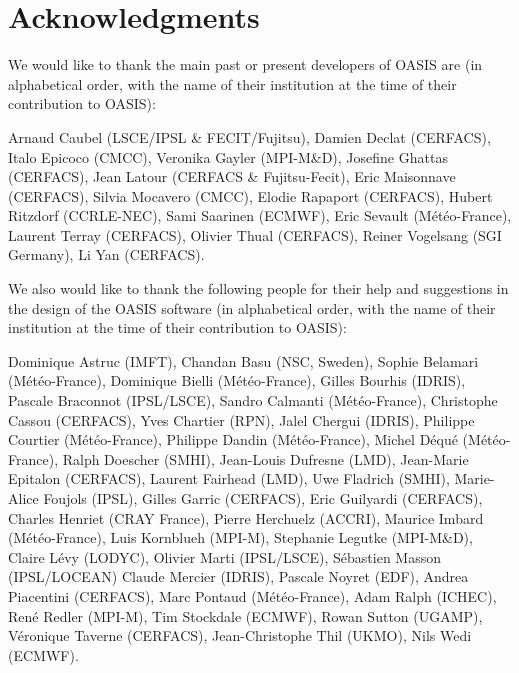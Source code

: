 \newpage


\section{Acknowledgments}

We would like to thank the main past or present developers of OASIS
are (in alphabetical order, with the name of their institution at the time of their contribution to OASIS):

Arnaud Caubel (LSCE/IPSL \& FECIT/Fujitsu),
Damien Declat (CERFACS),
Italo Epicoco (CMCC),
Veronika Gayler (MPI-M\&D),
Josefine Ghattas (CERFACS),
Jean Latour (CERFACS \& Fujitsu-Fecit),
Eric Maisonnave (CERFACS),
Silvia Mocavero (CMCC),
Elodie Rapaport (CERFACS),
Hubert Ritzdorf (CCRLE-NEC),
Sami Saarinen (ECMWF),
Eric Sevault (M\'et\'eo-France),
Laurent Terray (CERFACS),
Olivier Thual (CERFACS),
Reiner Vogelsang (SGI Germany),
Li Yan (CERFACS).

\vspace{0.5cm}
We also would like to thank the following people for their help
and suggestions in the design of the OASIS software (in alphabetical
order, with the name of their institution at the time of their contribution to OASIS):

Dominique Astruc (IMFT),
Chandan Basu (NSC, Sweden),
Sophie Belamari (M\'et\'eo-France),
Dominique Bielli (M\'et\'eo-France),
Gilles Bourhis (IDRIS),
Pascale Braconnot (IPSL/LSCE),
Sandro Calmanti (M\'et\'eo-France),
Christophe Cassou (CERFACS),
Yves Chartier (RPN),
Jalel Chergui (IDRIS),
Philippe Courtier (M\'et\'eo-France),
Philippe Dandin (M\'et\'eo-France),
Michel D\'equ\'e (M\'et\'eo-France),
Ralph Doescher (SMHI),
Jean-Louis Dufresne (LMD),
Jean-Marie Epitalon (CERFACS),
Laurent Fairhead (LMD),
Uwe Fladrich (SMHI),
Marie-Alice Foujols (IPSL),
Gilles Garric (CERFACS),
Eric Guilyardi (CERFACS),
Charles Henriet (CRAY France),
Pierre Herchuelz (ACCRI),
Maurice Imbard (M\'et\'eo-France),
Luis Kornblueh (MPI-M),
Stephanie Legutke (MPI-M\&D),
Claire L\'evy (LODYC),
Olivier Marti (IPSL/LSCE),
S\'ebastien Masson (IPSL/LOCEAN)
Claude Mercier (IDRIS),
Pascale Noyret (EDF),
Andrea Piacentini (CERFACS),
Marc Pontaud (M\'et\'eo-France),
Adam Ralph (ICHEC),
Ren\'e Redler (MPI-M),
Tim Stockdale (ECMWF),
Rowan Sutton (UGAMP),
V\'eronique Taverne (CERFACS),
Jean-Christophe Thil (UKMO),
Nils Wedi (ECMWF).



